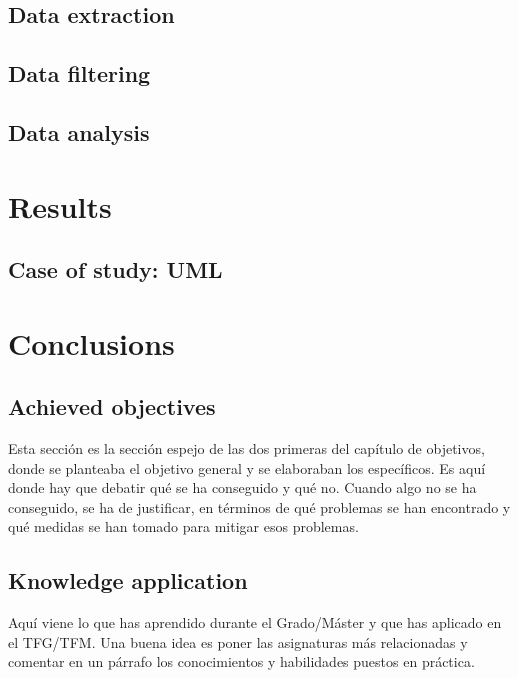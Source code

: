 \documentclass[a4paper, 12pt]{book}
\begin{document}
\section{Data extraction}
\label{sec:extraccion-datos}
\section{Data filtering}
\label{sec:filtro-datos}
\section{Data analysis}
\label{sec:analisis-datos}
\cleardoublepage
\chapter{Results}
\section{Case of study: UML}
\label{sec:caso-estudio-uml}
\cleardoublepage
\chapter{Conclusions}
\label{chap:conclusiones}
\section{Achieved objectives}
\label{sec:consecucion-objetivos}
Esta sección es la sección espejo de las dos primeras del capítulo de objetivos,
donde se planteaba el objetivo general y se elaboraban los específicos.
Es aquí donde hay que debatir qué se ha conseguido y qué no. Cuando algo no
se ha conseguido, se ha de justificar, en términos de qué problemas se han
encontrado y qué medidas se han tomado para mitigar esos problemas.
\section{Knowledge application}
\label{sec:aplicacion}
Aquí viene lo que has aprendido durante el Grado/Máster y que has aplicado
en el TFG/TFM. Una buena idea es poner las asignaturas más relacionadas y
comentar en un párrafo los conocimientos y habilidades puestos en práctica.
\end{document}
